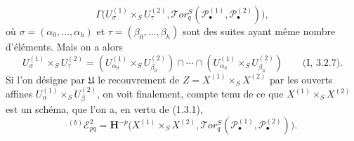 \begin{env}[6.6.4]
\[  \Gamma\bigl(U_\sigma^{(1)}\times_S U_\tau^{(2)},
    \mathscr{T}\!or_q^S
    (\mathscr P_\bullet^{(1)},\mathscr P_\bullet^{(2)})\bigr),
\]
où $\sigma=(\alpha_0,\ldots,\alpha_h)$ et
$\tau=(\beta_0,\ldots,\beta_h)$ sont des suites ayant même nombre d'éléments.
Mais on a alors
\[
  U_\sigma^{(1)}\times_S U_\tau^{(2)}
  =(U_{\alpha_0}^{(1)}\times_S U_{\beta_0}^{(2)})\cap\cdots\cap
    (U_{\alpha_h}^{(1)}\times_S U_{\beta_h}^{(2)})
  \qquad\text{(I, 3.2.7)}.
\]
Si l'on désigne par $\mathfrak U$ le recouvrement de
$Z=X^{(1)}\times_S X^{(2)}$ par les ouverts affines
$U_\alpha^{(1)}\times_S U_\beta^{(2)}$, on voit finalement, compte tenu de ce
que $X^{(1)}\times_S X^{(2)}$ est un schéma, que l'on a, en vertu de (1.3.1),
\[
  {}^{(b)}\mathscr E_{pq}^2
  =\mathbf H^{-p}\bigl(X^{(1)}\times_S X^{(2)},
    \mathscr{T}\!or_q^S
    (\mathscr P_\bullet^{(1)},\mathscr P_\bullet^{(2)})\bigr).
\]


\end{env}
